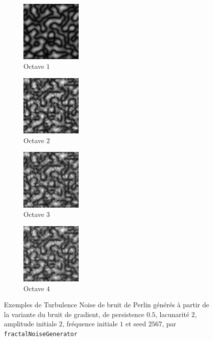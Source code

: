 \documentclass[11pt]{article}
\begin{document}
\begin{figure}[H]
    \centering
    \begin{subfigure}{0.2\textwidth}
    \centering
            \includegraphics[width=3cm]{TURBULENCE-GRADIENT-O1-P05-L2-IA2-IF1-S2567.png}
        \caption{Octave $1$}
        \label{fig:turbulenceGradientO1}
    \end{subfigure}
    \begin{subfigure}{0.2\textwidth}
    \centering
        \includegraphics[width=3cm]{TURBULENCE-GRADIENT-O2-P05-L2-IA2-IF1-S2567.png}
        \caption{Octave $2$}
        \label{fig:turbulenceGradientO2}
    \end{subfigure}
    \begin{subfigure}{0.2\textwidth}
    \centering
        \includegraphics[width=3cm]{TURBULENCE-GRADIENT-O3-P05-L2-IA2-IF1-S2567.png}
        \caption{Octave $3$}
        \label{fig:turbulenceGradientO3}
    \end{subfigure}
    \begin{subfigure}{0.2\textwidth}
    \centering
        \includegraphics[width=3cm]{TURBULENCE-GRADIENT-O4-P05-L2-IA2-IF1-S2567.png}
        \caption{Octave $4$}
        \label{fig:turbulenceGradientO4}
    \end{subfigure}
    \caption{Exemples de Turbulence Noise de bruit de Perlin générés à partir de la variante du bruit de gradient, de persistence $0.5$, lacunarité $2$, amplitude initiale $2$, fréquence initiale $1$ et seed $2567$, par \texttt{fractalNoiseGenerator}}
    \label{fig:turbulenceGradient}
\end{figure}
\end{document}
